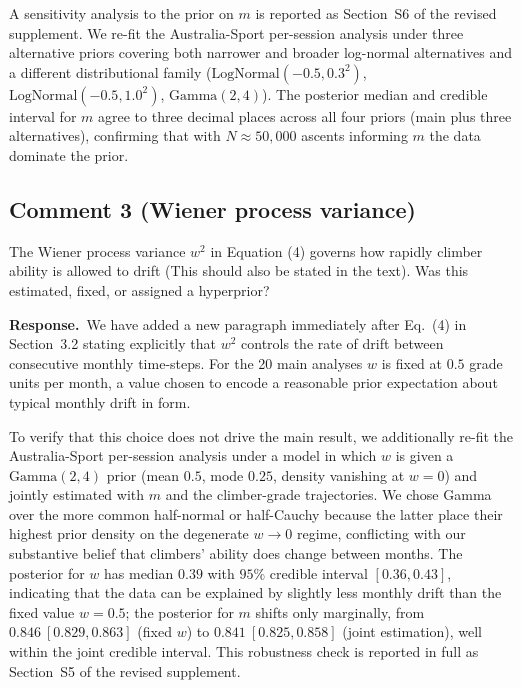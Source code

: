 \documentclass[11pt]{article}
\newenvironment{review}{\begingroup\color{revcolor}\itshape\par\noindent}{\par\endgroup}
\newcommand{\response}{\par\noindent\textbf{Response.}\ }
\begin{document}
A sensitivity analysis to the prior on $m$ is reported as Section~S6 of the revised supplement. We re-fit the Australia-Sport per-session analysis under three alternative priors covering both narrower and broader log-normal alternatives and a different distributional family ($\mathrm{LogNormal}(-0.5, 0.3^2)$, $\mathrm{LogNormal}(-0.5, 1.0^2)$, $\mathrm{Gamma}(2, 4)$). The posterior median and credible interval for $m$ agree to three decimal places across all four priors (main plus three alternatives), confirming that with $N \approx 50{,}000$ ascents informing $m$ the data dominate the prior.

\subsection*{Comment 3 (Wiener process variance)}

\begin{review}
The Wiener process variance $w^2$ in Equation (4) governs how rapidly climber ability is allowed to drift (This should also be stated in the text). Was this estimated, fixed, or assigned a hyperprior?
\end{review}
\response We have added a new paragraph immediately after Eq.~(4) in Section~3.2 stating explicitly that $w^2$ controls the rate of drift between consecutive monthly time-steps. For the 20 main analyses $w$ is fixed at $0.5$ grade units per month, a value chosen to encode a reasonable prior expectation about typical monthly drift in form.

To verify that this choice does not drive the main result, we additionally re-fit the Australia-Sport per-session analysis under a model in which $w$ is given a $\mathrm{Gamma}(2, 4)$ prior (mean $0.5$, mode $0.25$, density vanishing at $w=0$) and jointly estimated with $m$ and the climber-grade trajectories. We chose Gamma over the more common half-normal or half-Cauchy because the latter place their highest prior density on the degenerate $w \to 0$ regime, conflicting with our substantive belief that climbers' ability does change between months. The posterior for $w$ has median $0.39$ with $95\%$ credible interval $[0.36, 0.43]$, indicating that the data can be explained by slightly less monthly drift than the fixed value $w = 0.5$; the posterior for $m$ shifts only marginally, from $0.846\ [0.829, 0.863]$ (fixed $w$) to $0.841\ [0.825, 0.858]$ (joint estimation), well within the joint credible interval. This robustness check is reported in full as Section~S5 of the revised supplement.
\end{document}
